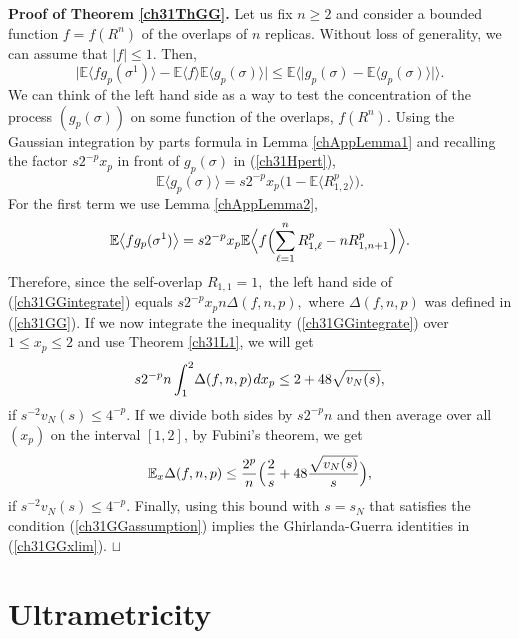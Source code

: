 \documentclass[12pt]{article}
\newcommand{\smsp}{\hspace{0.3mm}}
\newcommand{\e}{\mathbb{E}}
\newcommand{\la}{\langle}
\newcommand{\ra}{\rangle}
\newcommand\qed{\hfill\hbox{\rlap{$\sqcap$}$\sqcup$}}
\theoremstyle{nonumberplain}
\begin{document}
\noindent
\textbf{Proof of Theorem \ref{ch31ThGG}.}
Let us fix $n\geq 2$ and consider a bounded function $f=f(R^n)$ of the overlaps of $n$ replicas. Without loss of generality, we can assume that $|f|\leq 1$. Then, 
\begin{equation}
\bigl|\e\bigl\la f g_p(\sigma^1) \bigr\ra 
- \e \bigl \la f \bigr\ra \e \bigl\la g_p(\sigma) \bigr\ra \bigr|
\leq
\e \bigl\la \bigl| g_p(\sigma) - \e \bigl\la g_p(\sigma) \bigr\ra\bigr|\bigr\ra. 
\label{ch31GGintegrate}
\end{equation}
We can think of the left hand side as a way to test the concentration of the process $(g_p(\sigma))$ on some function of the overlaps, $f(R^n)$. Using the Gaussian integration by parts formula in Lemma \ref{chAppLemma1} and recalling the factor $s 2^{-p} x_p$ in front of $g_p(\sigma)$ in (\ref{ch31Hpert}),
$$
\e \bigl\la g_p(\sigma) \bigr\ra
=
s 2^{-p} x_p \bigl(1 - \e \bigl\la R_{1,2}^p \bigr\ra \bigr).
$$
For the first term we use Lemma \ref{chAppLemma2}, 
$$
\e\bigl\la f g_p(\sigma^1) \bigr\ra 
=
s 2^{-p} x_p \e \Bigl\la f \Bigl( \sum_{\ell=1}^n R_{1,\ell}^p - nR_{1,n+1}^p \Bigr)\Bigr\ra. 
$$
Therefore, since the self-overlap $R_{1,1} = 1,$ the left hand side of (\ref{ch31GGintegrate}) equals $s 2^{-p} x_p n\Delta(f,n,p),$ where $\Delta(f,n,p)$ was defined in (\ref{ch31GG}). If we now integrate the inequality (\ref{ch31GGintegrate}) over $1\leq x_p\leq 2$ and use Theorem \ref{ch31L1}, we will get  
\begin{equation}
s 2^{-p} n
\int_1^2 \!
\Delta(f,n,p)
\smsp dx_p
\leq 2 + 48 \sqrt{v_N(s)},
\end{equation}
if $s^{-2}v_N(s) \leq 4^{-p}$. If we divide both sides by $s 2^{-p} n$ and then average over all $(x_p)$ on the interval $[1,2]$, by Fubini's theorem, we get 
\begin{equation}
\e_x \Delta(f,n,p)
\leq 
\frac{2^p}{n}
\Bigl(
\frac{2}{s} + 48 \frac{\sqrt{v_N(s)}}{s}
\Bigr),
\label{ch31GGbasicintegrated}
\end{equation}
if $s^{-2}v_N(s) \leq 4^{-p}$.  Finally, using this bound with $s=s_N$ that satisfies the condition (\ref{ch31GGassumption}) implies the Ghirlanda-Guerra identities in (\ref{ch31GGxlim}).
\qed





\section{Ultrametricity}
\end{document}
